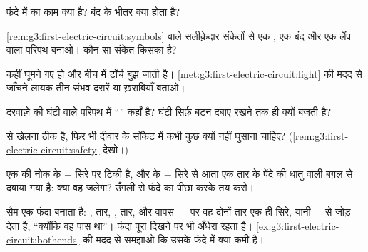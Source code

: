 \begin{exercise}[$\star$]\label{exo:g3:first-electric-circuit:4}
फंदे में  का काम क्या है? बंद  के भीतर क्या होता है?
\end{exercise}

\begin{exercise}[$\star$]\label{exo:g3:first-electric-circuit:5}
\cref{rem:g3:first-electric-circuit:symbols} वाले सलीक़ेदार संकेतों
से एक , एक बंद  और एक लैंप वाला परिपथ बनाओ। कौन-सा संकेत
किसका है?
\end{exercise}

\begin{exercise}[$\star$]\label{exo:g3:first-electric-circuit:6}
कहीं घूमने गए हो और बीच में टॉर्च बुझ जाती है।
\cref{met:g3:first-electric-circuit:light} की मदद से जाँचने लायक तीन
संभव दरारें या ख़राबियाँ बताओ।
\end{exercise}

\begin{exercise}[$\star$]\label{exo:g3:first-electric-circuit:7}
दरवाज़े की घंटी वाले परिपथ में ``'' कहाँ है? घंटी सिर्फ़ बटन
दबाए रखने तक ही क्यों बजती है?
\end{exercise}

\begin{exercise}[$\star$]\label{exo:g3:first-electric-circuit:8}
 से खेलना ठीक है, फिर भी दीवार के सॉकेट में कभी कुछ क्यों नहीं
घुसाना चाहिए? (\cref{rem:g3:first-electric-circuit:safety} देखो।)
\end{exercise}

\begin{exercise}[$\star$]\label{exo:g3:first-electric-circuit:9}
एक  की नोक  के $+$ सिरे पर टिकी है, और  के $-$ सिरे से
आता एक तार  के पेंदे की धातु वाली बग़ल से दबाया गया है: क्या वह
जलेगा? उँगली से फंदे का पीछा करके तय करो।
\end{exercise}

\begin{exercise}[$\star\star$]\label{exo:g3:first-electric-circuit:10}
सैम एक फंदा बनाता है: , तार, , तार, और वापस  --- पर वह
दोनों तार एक ही सिरे, यानी $-$ से जोड़ देता है, ``क्योंकि वह पास
था''। फंदा पूरा दिखने पर भी  अँधेरा रहता है।
\cref{ex:g3:first-electric-circuit:bothends} की मदद से समझाओ कि उसके
फंदे में क्या कमी है।
\end{exercise}

